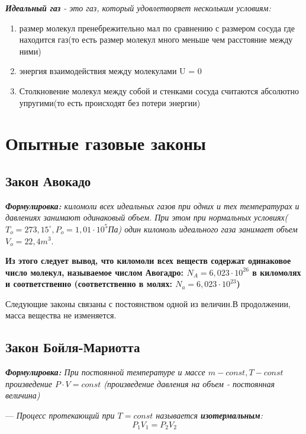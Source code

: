 \documentclass[../main.tex]{subfiles}
\begin{document}
 \textit{\textbf{Идеальный газ} - это газ, который удовлетворяет нескольким условиям:}
\begin{enumerate}
    \item размер молекул пренебрежительно мал по сравнению с размером сосуда где находится газ(то есть размер молекул много меньше чем расстояние между ними)
    \item энергия взаимодействия между молекулами U = 0
    \item Столкновение молекул между собой и стенками сосуда считаются абсолютно упругими(то есть происходят без потери энергии)
\end{enumerate}
\section{Опытные газовые законы}

\subsection{Закон Авокадо}
\textit{\textbf{Формулировка:} киломоли всех идеальных газов при одних и тех температурах и давлениях занимают одинаковый объем. При этом при нормальных условиях($T_o = 273,15^{\circ}, P_o = 1,01 \cdot 10^5$Па) один киломоль идеального газа занимает объем $V_o = 22,4m^3$}.

\vspace{5px}

\textbf{Из этого следует вывод, что киломоли всех веществ содержат одинаковое число молекул, называемое числом Авогадро:
    $N_A = 6,023 \cdot 10^{26}$ в киломолях и соответственно (соответственно в молях: $N_a = 6,023 \cdot 10^{23}$)}

\vspace{5px}

Следующие законы связаны с постоянством одной из величин.В продолжении, масса вещества не изменяется.

\subsection{Закон Бойля-Мариотта}
\textit{\textbf{Формулировка:} При постоянной температуре и массе $m - const, T- const$ произведение $P \cdot V = const$ (произведение давления на объем - постоянная величина)}

\vspace{5px}

--- \textit{Процесс протекающий при $T = const$ называется \textbf{изотермальным}: }
\[ P_1V_1 = P_2V_2\]
\end{document}
